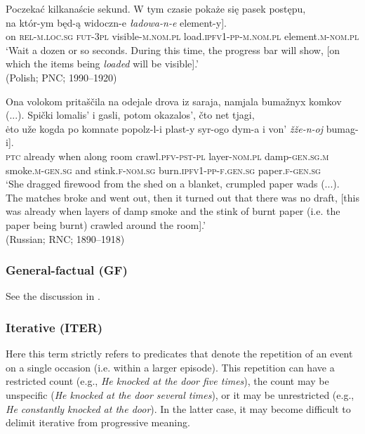 \documentclass[output=paper]{langscibook}
\begin{document}
\ea\label{wiem:ex:loaded-pol}
{Poczekać kilkanaście sekund. W tym czasie pokaże się pasek postępu},\\
\gll \minsp{[} {na} {któr-ym}  {będ-ą} {widoczn-e } \textit{{ładowa-n-e}} {element-y}].\\ 
{} on \textsc{rel-m.loc.sg} \textsc{fut-3pl} visible-\textsc{m.nom.pl} load.\textsc{ipfv1-pp-m.nom.pl} element.\textsc{m-nom.pl}\\
\glt ‘Wait a dozen or so seconds. During this time, the progress bar will show, [on which the items being \textit{loaded} will be visible].’ \\
\hfill(Polish; PNC; 1990--1920)
\z

\ea\label{wiem:ex:burnt}
{Ona volokom pritaščila na odejale drova iz saraja, namjala bumažnyx komkov} (...). {Spički lomalis’ i gasli, potom okazalos’, čto net tjagi},\\
\gll \minsp{[} {ėto} {uže} {kogda} {po} {komnate} {popolz-l-i} {plast-y} {syr-ogo} {dym-a} {i} {von’} {\textit{žže-n-oj}} {bumag-i}].\\
{} \textsc{ptc} already when along room crawl.\textsc{pfv-pst-pl} layer-\textsc{nom.pl} damp-\textsc{gen.sg.m} smoke.\textsc{m-gen.sg} and stink.\textsc{f-nom.sg} burn.\textsc{ipfv1-pp-f.gen.sg} paper.\textsc{f-gen.sg}\\
\glt‘She dragged firewood from the shed on a blanket, crumpled paper wads (...). The matches broke and went out, then it turned out that there was no draft, [this was already when layers of damp smoke and the stink of burnt paper (i.e. the paper being burnt) crawled around the room].’ \\ 
\hfill (Russian; RNC; 1890--1918)
\z




\subsubsection{General-factual (GF)}

See the discussion in .

\subsubsection{Iterative (ITER)}

Here this term strictly refers to predicates that denote the repetition of an event on a single occasion (i.e. within a larger episode). This repetition can have a restricted count (e.g., \textit{He knocked at the door five times}), the count may be unspecific (\textit{He knocked at the door several times}), or it may be unrestricted (e.g., \textit{He constantly knocked at the door}). In the latter case, it may become difficult to delimit iterative from progressive meaning.
\end{document}
